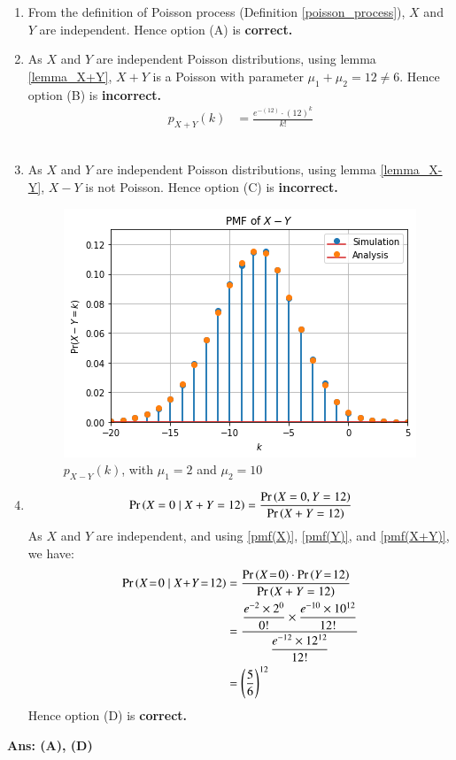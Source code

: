 \documentclass[journal,12pt,twocolumn]{IEEEtran}
\begin{document}
    
\begin{enumerate}[label=\textbf{(\Alph*)}]
    \item From the definition of Poisson process (Definition \ref{poisson_process}), $X$ and $Y$ are independent. Hence option (A) is \textbf{correct.}\\

    \item As $X$ and $Y$ are independent Poisson distributions, using lemma \eqref{lemma_X+Y}, $X+ Y$ is a Poisson with parameter $\mu_1 + \mu_2 = 12 \neq 6$. Hence option (B) is \textbf{incorrect.}
    \begin{align}
         p_{X+Y}(k) &= \frac{e^{-(12)} \cdot (12)^k}{k!}\label{pmf(X+Y)}
    \end{align}\\
    \item  As $X$ and $Y$ are independent Poisson distributions, using lemma \eqref{lemma_X-Y}, $X-Y$ is not Poisson. Hence option (C) is \textbf{incorrect.}\\
    \begin{figure}[h!]\label{graph_X-Y}
    \centering
      \includegraphics[width=\columnwidth]{Figures/pmf(X-Y).png}
     \caption{$p_{X-Y}(k)$, with $\mu_1=2$ and $\mu_2=10$}
\end{figure}

    \item \begin{align}
        \Pr\left(X=0\mid X+Y=12\right) = \dfrac{\Pr\left(X=0, Y=12\right)}{\Pr\left(X+Y=12\right)}
    \end{align}
    As $X$ and $Y$ are independent, and using \eqref{pmf(X)}, \eqref{pmf(Y)}, and \eqref{pmf(X+Y)}, we have:
    \begin{align}
        \pr{X\!=\!0\mid X\!+\!Y\!=\!12} &= \frac{\pr{X\!=\!0} \cdot \pr{Y\!=\!12}}{\pr{X+Y=12}} \\
        &= \frac{\dfrac{e^{-2}\times 2^{0}}{0!} \times \dfrac{e^{-10}\times10^{12}}{12!}}{\dfrac{e^{-12}\times12^{12}}{12!}}\\
        &= \left(\dfrac{5}{6}\right)^{12}
    \end{align}
    Hence option (D) is \textbf{correct.}
\end{enumerate}
\textbf{Ans: (A), (D)}
\end{document}
